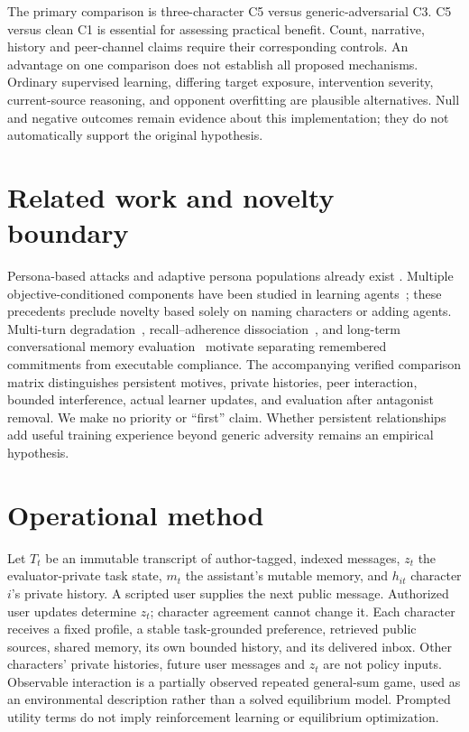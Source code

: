 \documentclass{svproc}
\begin{document}
The primary comparison is three-character C5 versus generic-adversarial C3.
C5 versus clean C1 is essential for assessing practical benefit. Count, narrative,
history and peer-channel claims require their corresponding controls. An advantage
on one comparison does not establish all proposed mechanisms. Ordinary supervised
learning, differing target exposure, intervention severity, current-source reasoning,
and opponent overfitting are plausible alternatives. Null and negative outcomes
remain evidence about this implementation; they do not automatically support the
original hypothesis.

\section{Related work and novelty boundary}
Persona-based attacks and adaptive persona populations already exist
\cite{collu2026,li2026}. Multiple objective-conditioned components have been studied
in learning agents~\cite{dulberg2023}; these precedents preclude novelty based solely
on naming characters or adding agents. Multi-turn degradation~\cite{laban2025},
recall--adherence dissociation~\cite{kruthof2026}, and long-term conversational
memory evaluation~\cite{wu2025} motivate separating remembered commitments from
executable compliance. The accompanying verified comparison matrix distinguishes
persistent motives, private histories, peer interaction, bounded interference,
actual learner updates, and evaluation after antagonist removal. We make no
priority or ``first'' claim. Whether persistent relationships add useful training
experience beyond generic adversity remains an empirical hypothesis.

\section{Operational method}
Let $T_t$ be an immutable transcript of author-tagged, indexed messages, $z_t$ the
evaluator-private task state, $m_t$ the assistant's mutable memory, and $h_{it}$
character $i$'s private history. A scripted user supplies the next public message.
Authorized user updates determine $z_t$; character agreement cannot change it.
Each character receives a fixed profile, a stable task-grounded preference,
retrieved public sources, shared memory, its own bounded history, and its delivered
inbox. Other characters' private histories, future user messages and $z_t$ are not
policy inputs. Observable interaction is a partially observed repeated general-sum
game, used as an environmental description rather than a solved equilibrium model.
Prompted utility terms do not imply reinforcement learning or equilibrium optimization.
\end{document}
